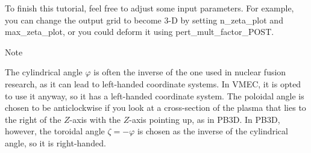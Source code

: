 To finish this tutorial, feel free to adjust some input parameters. For example, you can change the output grid to become 3-\/D by setting {\ttfamily n\+\_\+zeta\+\_\+plot} and {\ttfamily max\+\_\+zeta\+\_\+plot}, or you could deform it using {\ttfamily pert\+\_\+mult\+\_\+factor\+\_\+\+P\+O\+ST}.

\begin{DoxyNote}{Note}

\begin{DoxyEnumerate}
\item \label{page_tutorial_fnt1}%
%
The cylindrical angle $\varphi$ is often the inverse of the one used in nuclear fusion research, as it can lead to left-\/handed coordinate systems. In V\+M\+EC, it is opted to use it anyway, so it has a left-\/handed coordinate system. The poloidal angle is chosen to be anticlockwise if you look at a cross-\/section of the plasma that lies to the right of the $Z$-\/axis with the $Z$-\/axis pointing up, as in P\+B3D. In P\+B3D, however, the toroidal angle $\zeta = - \varphi$ is chosen as the inverse of the cylindrical angle, so it is right-\/handed. 
\end{DoxyEnumerate}
\end{DoxyNote}
